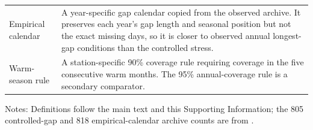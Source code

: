 \begin{table}[p]
\begin{tabular}{>{\raggedright\arraybackslash}p{}>{\raggedright\arraybackslash}p{}}
Empirical calendar & A year-specific gap calendar copied from the observed archive. It preserves each year's gap length and seasonal position but not the exact missing days, so it is closer to observed annual longest-gap conditions than the controlled stress. \\
Warm-season rule & A station-specific 90\% coverage rule requiring coverage in the five consecutive warm months. The 95\% annual-coverage rule is a secondary comparator. \\
\bottomrule
\end{tabular}
\par\smallskip\footnotesize Notes: Definitions follow the main text and this Supporting Information; the 805 controlled-gap and 818 empirical-calendar archive counts are from .
\end{table}
